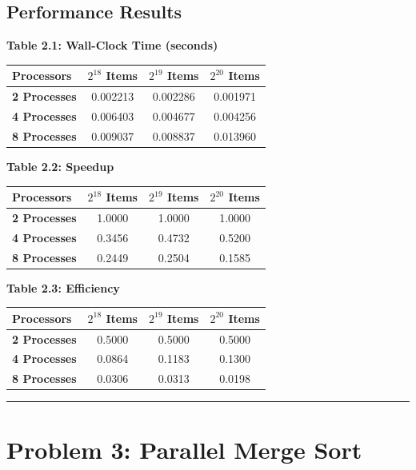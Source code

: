 \documentclass[11pt]{article}
\begin{document}
\subsection*{Performance Results}

\begin{center}
\textbf{Table 2.1: Wall-Clock Time (seconds)} \\
\begin{tabular}{@{}lccc@{}}
\toprule
Processors & $2^{18}$ Items & $2^{19}$ Items & $2^{20}$ Items \\
\midrule
\textbf{2 Processes} & 0.002213 & 0.002286 & 0.001971 \\
\textbf{4 Processes} & 0.006403 & 0.004677 & 0.004256 \\
\textbf{8 Processes} & 0.009037 & 0.008837 & 0.013960 \\
\bottomrule
\end{tabular}
\end{center}

\begin{center}
\textbf{Table 2.2: Speedup} \\
\begin{tabular}{@{}lccc@{}}
\toprule
Processors & $2^{18}$ Items & $2^{19}$ Items & $2^{20}$ Items \\
\midrule
\textbf{2 Processes} & 1.0000 & 1.0000 & 1.0000 \\
\textbf{4 Processes} & 0.3456 & 0.4732 & 0.5200 \\
\textbf{8 Processes} & 0.2449 & 0.2504 & 0.1585 \\
\bottomrule
\end{tabular}
\end{center}

\begin{center}
\textbf{Table 2.3: Efficiency} \\
\begin{tabular}{@{}lccc@{}}
\toprule
Processors & $2^{18}$ Items & $2^{19}$ Items & $2^{20}$ Items \\
\midrule
\textbf{2 Processes} & 0.5000 & 0.5000 & 0.5000 \\
\textbf{4 Processes} & 0.0864 & 0.1183 & 0.1300 \\
\textbf{8 Processes} & 0.0306 & 0.0313 & 0.0198 \\
\bottomrule
\end{tabular}
\end{center}

\noindent\rule{\textwidth}{0.4pt}

\section*{\color{white}Problem 3: Parallel Merge Sort}
\end{document}
